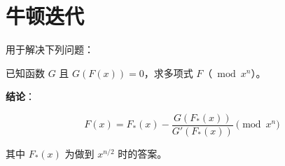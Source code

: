 \section{牛顿迭代}

用于解决下列问题：

\begin{tcolorbox}
已知函数 $G$ 且 $G(F(x)) = 0$，求多项式 $F$（${}\bmod x^n$）。
\end{tcolorbox}

\textbf{结论}：

$$
F(x) = F_*(x) - \frac{G(F_*(x))}{G'(F_*(x))} \pmod{x^n}
$$

其中 $F_*(x)$ 为做到 $x^{n / 2}$ 时的答案。